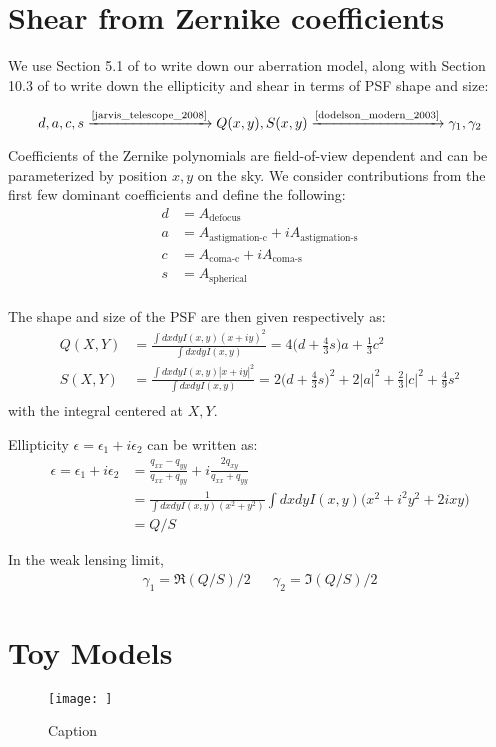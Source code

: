 \section{Shear from Zernike coefficients} \label{sec:ell_zernike} 

We use Section 5.1 of \cite{jarvis_telescope_2008} to write down our aberration model, along with Section 10.3 of \cite{dodelson_modern_2003} to write down the ellipticity and shear in terms of PSF shape and size: 

\begin{equation}
d, a, c, s \xrightarrow{\text{\cite{jarvis_telescope_2008}}} Q(x, y), S(x, y) \xrightarrow{\text{\cite{dodelson_modern_2003}}} \gamma_1, \gamma_2
\end{equation}

Coefficients of the Zernike polynomials are field-of-view dependent and can be parameterized by position $x, y$ on the sky. We consider contributions from the first few dominant coefficients and define the following:
\begin{align}
d &= A_\text{defocus} \\
a &= A_\text{astigmation-c} + i A_\text{astigmation-s} \\
c &= A_\text{coma-c} + i A_\text{coma-s} \\
s &= A_\text{spherical} \\
\end{align}

The shape and size of the PSF are then given respectively as:
\begin{align}
Q(X, Y) &= \frac{\int dx dy I(x, y) (x+iy)^2}{\int dx dy I(x, y)} = 4 \Big(d+\frac{4}{3}s \Big) a + \frac{1}{3} c^2\\
S(X, Y) &= \frac{\int dx dy I(x, y) |x+iy|^2}{\int dx dy I(x, y)} = 2 \Big(d+\frac{4}{3}s \Big)^2 + 2 |a|^2 + \frac{2}{3} |c|^2 + \frac{4}{9} s^2\\
\end{align}
with the integral centered at $X, Y$. 

Ellipticity $\epsilon = \epsilon_1 + i \epsilon_2$ can be written as:
\begin{align}
\epsilon = \epsilon_1 + i \epsilon_2 &= \frac{q_{xx} - q_{yy}}{q_{xx} + q_{yy}} + i \frac{2 q_{xy}}{q_{xx} + q_{yy}}\\
&= \frac{1}{\int dx dy I(x, y) (x^2 + y^2)} \int dx dy I(x, y) \Big( x^2 + i^2 y^2 + 2ixy \Big) \\
&= Q \Big/ S
\end{align}

In the weak lensing limit, 
\begin{align}
\gamma_1 = \Re(Q / S) \Big/ 2 && \gamma_2 = \Im(Q / S) \Big/ 2
\end{align}

\section{Toy Models} \label{sec:toy_models}

\begin{figure}
\centering
\texttt{[image: ]}
\caption{Caption}
\label{fig:my_label}
\end{figure}
